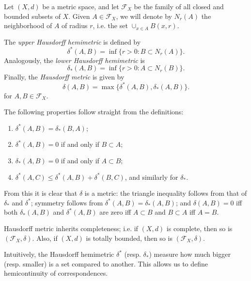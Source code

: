 \documentclass[12pt]{article}
\begin{document}
Let $(X,d)$ be a metric space, and let $\mathcal{F}_X$ be the family of all
closed and bounded subsets of $X$. Given $A\in \mathcal{F}_X$, we will denote by
$N_r(A)$ the neighborhood of $A$ of radius $r$, i.e. the set
$\cup_{x\in A} B(x,r)$.

The \emph{upper Hausdorff hemimetric} is defined by
 $$\delta^*(A,B)=\inf\{r>0 : B\subset N_r(A)\}.$$
Analogously, the \emph{lower Hausdorff hemimetric} is $$\delta_*(A,B) =
\inf\{r>0 : A\subset N_r(B)\}.$$ 
Finally, the \emph{Hausdorff metric} is given by
$$\delta(A,B) = \max\{\delta^*(A,B),\delta_*(A,B)\}.$$
for $A,B\in \mathcal{F}_X$.

The following properties follow straight from the definitions:
\begin{enumerate}
\item $\delta^*(A,B) = \delta_*(B,A)$;
\item $\delta^*(A,B)=0$ if and only if $B\subset A$;
\item $\delta_*(A,B)=0$ if and only if $A\subset B$;
\item $\delta^*(A,C) \leq \delta^*(A,B) + \delta^*(B,C)$, and similarly for
$\delta_*$.
\end{enumerate}

From this it is clear that $\delta$ is a metric: the triangle inequality follows from that of $\delta_*$ and $\delta^*$; symmetry follows from
$\delta^*(A,B)=\delta_*(A,B)$; and $\delta(A,B) = 0$ iff both $\delta_*(A,B)$ and $\delta^*(A,B)$ are zero iff $A\subset B$ and $B\subset A$ iff $A=B$.

Hausdorff metric inherits completeness; i.e. if $(X,d)$ is complete, then so is $(\mathcal{F}_X,\delta)$. Also, if $(X,d)$ is totally bounded, then so is
$(\mathcal{F}_X,\delta)$. 

Intuitively, the Hausdorff hemimetric $\delta^*$ (resp. $\delta_*$) measure how much bigger (resp. smaller) is a set compared to another. This allows us to define hemicontinuity of correspondences.
\end{document}
